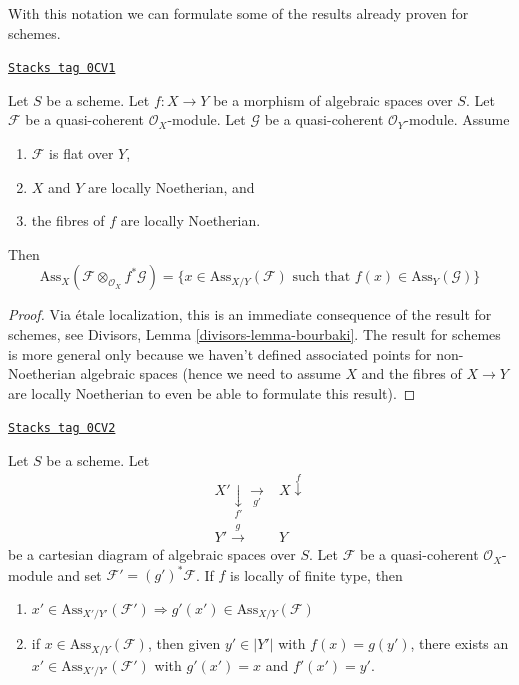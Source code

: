 With this notation we can formulate some of the results
already proven for schemes.

\begin{lemma}[Bourbaki]
\label{spaces-divisors-lemma-bourbaki}
\href{https://stacks.math.columbia.edu/tag/0CV1}{\texttt{Stacks tag 0CV1}}

Let $S$ be a scheme.
Let $f : X \to Y$ be a morphism of algebraic spaces over $S$.
Let $\mathcal{F}$ be a quasi-coherent $\mathcal{O}_X$-module.
Let $\mathcal{G}$ be a quasi-coherent $\mathcal{O}_Y$-module.
Assume
\begin{enumerate}
\item $\mathcal{F}$ is flat over $Y$,
\item $X$ and $Y$ are locally Noetherian, and
\item the fibres of $f$ are locally Noetherian.
\end{enumerate}
Then
$$
\text{Ass}_X(\mathcal{F} \otimes_{\mathcal{O}_X} f^*\mathcal{G}) =
\{x \in \text{Ass}_{X/Y}(\mathcal{F})\text{ such that }
f(x) \in \text{Ass}_Y(\mathcal{G}) \}
$$
\end{lemma}

\begin{proof}
Via \'etale localization, this is an immediate consequence of the result
for schemes, see
Divisors, Lemma \ref{divisors-lemma-bourbaki}.
The result for schemes is more general only because
we haven't defined associated points for
non-Noetherian algebraic spaces (hence we need to assume $X$
and the fibres of $X \to Y$ are locally Noetherian to even
be able to formulate this result).
\end{proof}

\begin{lemma}
\label{spaces-divisors-lemma-base-change-relative-assassin}
\href{https://stacks.math.columbia.edu/tag/0CV2}{\texttt{Stacks tag 0CV2}}

Let $S$ be a scheme. Let
$$
\begin{array}{cc}X' \underset{f'}{\downarrow}\underset{g'}{\longrightarrow} & X \overset{f}{\downarrow} \\ Y' \overset{g}{\longrightarrow} & Y\end{array}
$$
be a cartesian diagram of algebraic spaces over $S$.
Let $\mathcal{F}$ be a quasi-coherent $\mathcal{O}_X$-module
and set $\mathcal{F}' = (g')^*\mathcal{F}$.
If $f$ is locally of finite type, then
\begin{enumerate}
\item $x' \in \text{Ass}_{X'/Y'}(\mathcal{F}')
\Rightarrow g'(x') \in \text{Ass}_{X/Y}(\mathcal{F})$
\item if $x \in \text{Ass}_{X/Y}(\mathcal{F})$, then given
$y' \in |Y'|$ with $f(x) = g(y')$, there exists an
$x' \in \text{Ass}_{X'/Y'}(\mathcal{F}')$
with $g'(x') = x$ and $f'(x') = y'$.
\end{enumerate}
\end{lemma}

